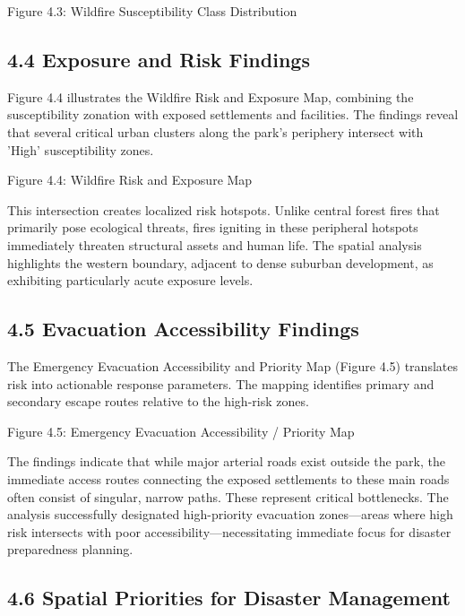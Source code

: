 \documentclass[12pt,a4paper]{article}
\begin{document}
Figure 4.3: Wildfire Susceptibility Class Distribution



\subsection*{4.4 Exposure and Risk Findings}

Figure 4.4 illustrates the Wildfire Risk and Exposure Map, combining the susceptibility zonation with exposed settlements and facilities. The findings reveal that several critical urban clusters along the park's periphery intersect with 'High' susceptibility zones.


Figure 4.4: Wildfire Risk and Exposure Map


This intersection creates localized risk hotspots. Unlike central forest fires that primarily pose ecological threats, fires igniting in these peripheral hotspots immediately threaten structural assets and human life. The spatial analysis highlights the western boundary, adjacent to dense suburban development, as exhibiting particularly acute exposure levels.



\subsection*{4.5 Evacuation Accessibility Findings}

The Emergency Evacuation Accessibility and Priority Map (Figure 4.5) translates risk into actionable response parameters. The mapping identifies primary and secondary escape routes relative to the high-risk zones.


Figure 4.5: Emergency Evacuation Accessibility / Priority Map


The findings indicate that while major arterial roads exist outside the park, the immediate access routes connecting the exposed settlements to these main roads often consist of singular, narrow paths. These represent critical bottlenecks. The analysis successfully designated high-priority evacuation zones—areas where high risk intersects with poor accessibility—necessitating immediate focus for disaster preparedness planning.



\subsection*{4.6 Spatial Priorities for Disaster Management}
\end{document}
